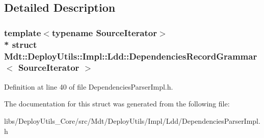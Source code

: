 \subsection{Detailed Description}
\subsubsection*{template$<$typename Source\+Iterator$>$\\*
struct Mdt\+::\+Deploy\+Utils\+::\+Impl\+::\+Ldd\+::\+Dependencies\+Record\+Grammar$<$ Source\+Iterator $>$}



Definition at line 40 of file Dependencies\+Parser\+Impl.\+h.



The documentation for this struct was generated from the following file\+:\begin{DoxyCompactItemize}
\item 
libs/\+Deploy\+Utils\+\_\+\+Core/src/\+Mdt/\+Deploy\+Utils/\+Impl/\+Ldd/Dependencies\+Parser\+Impl.\+h\end{DoxyCompactItemize}
